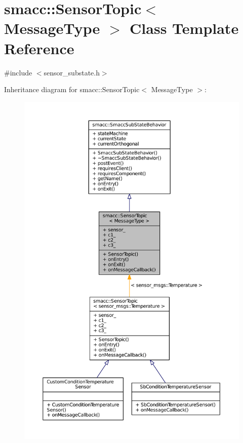 \hypertarget{classsmacc_1_1SensorTopic}{}\section{smacc\+:\+:Sensor\+Topic$<$ Message\+Type $>$ Class Template Reference}
\label{classsmacc_1_1SensorTopic}


{\ttfamily \#include $<$sensor\+\_\+substate.\+h$>$}



Inheritance diagram for smacc\+:\+:Sensor\+Topic$<$ Message\+Type $>$\+:
\nopagebreak
\begin{figure}[H]
\begin{center}
\leavevmode
\includegraphics[width=350pt]{classsmacc_1_1SensorTopic__inherit__graph}
\end{center}
\end{figure}


